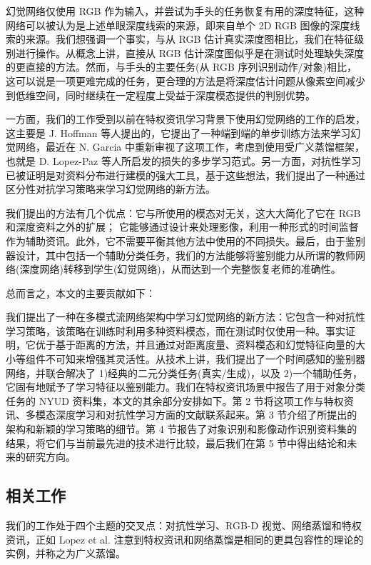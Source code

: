 幻觉网络仅使用 RGB 作为输入，并尝试为手头的任务恢复有用的深度特征，这种网络可以被认为是上述单眼深度线索的来源，即来自单个 2D RGB 图像的深度线索的来源。我们想强调一个事实，与从 RGB 估计真实深度图相比，我们在特征级别进行操作。从概念上讲，直接从 RGB 估计深度图似乎是在测试时处理缺失深度的更直接的方法。然而，与手头的主要任务(从 RGB 序列识别动作/对象)相比，这可以说是一项更难完成的任务，更合理的方法是将深度估计问题从像素空间减少到低维空间，同时继续在一定程度上受益于深度模态提供的判别优势。

一方面，我们的工作受到以前在特权资讯学习背景下使用幻觉网络的工作的启发，这主要是 J. Hoffman 等人提出的，它提出了一种端到端的单步训练方法来学习幻觉网络，最近在  N. Garcia 中重新审视了这项工作，考虑到使用受广义蒸馏框架，也就是 D. Lopez-Paz 等人所启发的损失的多步学习范式。另一方面，对抗性学习已被证明是对资料分布进行建模的强大工具，基于这些想法，我们提出了一种通过区分性对抗学习策略来学习幻觉网络的新方法。


我们提出的方法有几个优点：它与所使用的模态对无关，这大大简化了它在 RGB 和深度资料之外的扩展； 它能够通过设计来处理影像，利用一种形式的时间监督作为辅助资讯。此外，它不需要平衡其他方法中使用的不同损失。最后，由于鉴别器设计，其中包括一个辅助分类任务，我们的方法能够将鉴别能力从所谓的教师网络(深度网络)转移到学生(幻觉网络)，从而达到一个完整恢复老师的准确性。

总而言之，本文的主要贡献如下：

我们提出了一种在多模式流网络架构中学习幻觉网络的新方法：它包含一种对抗性学习策略，该策略在训练时利用多种资料模态，而在测试时仅使用一种。事实证明，它优于基于距离的方法，并且通过对距离度量、资料模态和幻觉特征向量的大小等组件不可知来增强其灵活性。从技术上讲，我们提出了一个时间感知的鉴别器网络，并联合解决了 1)经典的二元分类任务(真实/生成)，以及 2)一个辅助任务，它固有地赋予了学习特征以鉴别能力。我们在特权资讯场景中报告了用于对象分类任务的 NYUD 资料集，本文的其余部分安排如下。第 2 节将这项工作与特权资讯、多模态深度学习和对抗性学习方面的文献联系起来。第 3 节介绍了所提出的架构和新颖的学习策略的细节。第 4 节报告了对象识别和影像动作识别资料集的结果，将它们与当前最先进的技术进行比较，最后我们在第 5 节中得出结论和未来的研究方向。

\subsection{相关工作}
我们的工作处于四个主题的交叉点：对抗性学习、RGB-D 视觉、网络蒸馏和特权资讯，正如 Lopez et al. 注意到特权资讯和网络蒸馏是相同的更具包容性的理论的实例，并称之为广义蒸馏。

